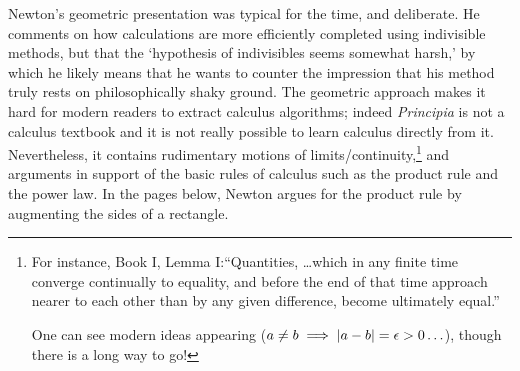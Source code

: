 Newton's geometric presentation was typical for the time, and deliberate. He comments on how calculations are more efficiently completed using indivisible methods, but that the `hypothesis of indivisibles seems somewhat harsh,' by which he likely means that he wants to counter the impression that his method truly rests on philosophically shaky ground. The geometric approach makes it hard for modern readers to extract calculus algorithms; indeed \emph{Principia} is not a calculus textbook and it is not really possible to learn calculus directly from it. Nevertheless, it contains rudimentary motions of limits/continuity,\footnote{For instance, Book I, Lemma I:\lstsp ``Quantities, \ldots which in any finite time converge continually to equality, and before the end of that time approach nearer to each other than by any given difference, become ultimately equal.''\par
One can see modern ideas appearing ($a\neq b\implies \left| a-b\right|=\epsilon>0\ldots$), though there is a long way to go!} and arguments in support of the basic rules of calculus such as the product rule and the power law. In the pages below, Newton argues for the product rule by augmenting the sides of a rectangle.


